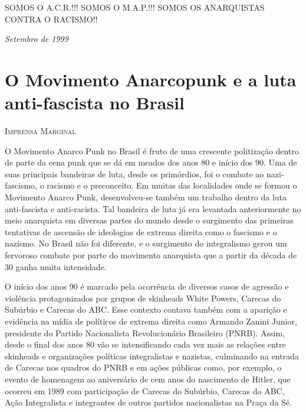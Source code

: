 SOMOS O A.C.R.!!! SOMOS O M.A.P.!!! SOMOS OS ANARQUISTAS CONTRA O RACISMO!!

\hfill{}\emph{Setembro de 1999}


\chapter{O Movimento Anarcopunk e a luta anti-fascista no Brasil}

\hfill{}\textsc{Imprensa Marginal}

\bigskip

O Movimento Anarco Punk no Brasil é fruto de uma crescente politização dentro de parte da cena punk que se dá em meados dos anos 80 e início dos 90. Uma de suas principais bandeiras de luta, desde os primórdios, foi o combate ao nazi-fascismo, o racismo e o preconceito. Em muitas das localidades onde se formou o Movimento Anarco Punk, desenvolveu-se também um trabalho dentro da luta anti-fascista e anti-racista. Tal bandeira de luta já era levantada anteriormente no meio anarquista em diversas partes do mundo desde o surgimento das primeiras tentativas de ascensão de ideologias de extrema direita como o fascismo e o nazismo. No Brasil não foi diferente, e o surgimento do integralismo gerou um fervoroso combate por parte do movimento anarquista que a partir da década de 30 ganha muita intensidade.

O início dos anos 90 é marcado pela ocorrência de diversos casos de agressão e violência protagonizados por grupos de skinheads White Powers, Carecas do Subúrbio e Carecas do ABC. Esse contexto contava também com a aparição e evidência na mídia de políticos de extrema direita como Armando Zanini Junior, presidente do Partido Nacionalista Revolucionário Brasileiro (PNRB). Assim, desde o final dos anos 80 vão se intensificando cada vez mais as relações entre skinheads e organizações políticas integralistas e nazistas, culminando na entrada de Carecas nos quadros do PNRB e em ações públicas como, por exemplo, o evento de homenagem ao aniversário de cem anos do nascimento de Hitler, que ocorreu em 1989 com participação de Carecas do Subúrbio, Carecas do ABC, Ação Integralista e integrantes de outros partidos nacionalistas na Praça da Sé.


